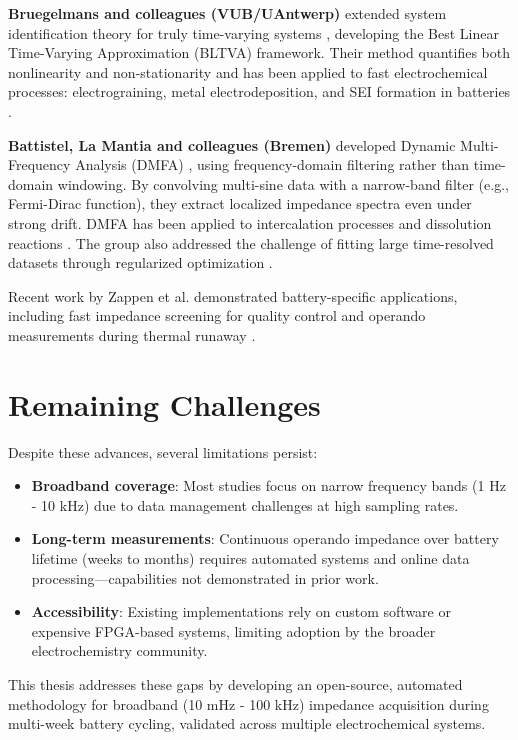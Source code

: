 \textbf{Bruegelmans and colleagues (VUB/UAntwerp)} extended system identification theory for truly time-varying systems \cite{breugelmansOddRandomPhase2012}, developing the Best Linear Time-Varying Approximation (BLTVA) framework. Their method quantifies both nonlinearity and non-stationarity \cite{hallemansDetectionClassificationQuantification2021, hallemansBestLinearTimeVarying2021} and has been applied to fast electrochemical processes: electrograining, metal electrodeposition, and SEI formation in batteries \cite{dabirihavighOperandoORPEISMonitoring2025, hallemansOperandoElectrochemicalImpedance2022}.

\textbf{Battistel, La Mantia and colleagues (Bremen)} developed Dynamic Multi-Frequency Analysis (DMFA) \cite{kosterDynamicImpedanceSpectroscopy2017, battistelPhysicalDefinitionDynamic2019}, using frequency-domain filtering rather than time-domain windowing. By convolving multi-sine data with a narrow-band filter (e.g., Fermi-Dirac function), they extract localized impedance spectra even under strong drift. DMFA has been applied to intercalation processes \cite{scarpioniElectrochemicalImpedanceSpectroscopy2023a, erinmwingbovoDynamicImpedanceSpectroscopy2019, erinmwingbovoDynamicImpedanceSpectroscopy2020} and dissolution reactions \cite{kosterMeasurementAnalysisDynamic2018}. The group also addressed the challenge of fitting large time-resolved datasets through regularized optimization \cite{battistelAnalysisNonstationaryImpedance2016, chukwuDynamicImpedanceSpectroscopy2023}.

Recent work by Zappen et al. \cite{zappenApplicationTimeResolvedMultiSine2018} demonstrated battery-specific applications, including fast impedance screening for quality control and operando measurements during thermal runaway \cite{zappenInOperandoImpedanceSpectroscopy2020a}.

\section{Remaining Challenges}

Despite these advances, several limitations persist:

\begin{itemize}
\item \textbf{Broadband coverage}: Most studies focus on narrow frequency bands (1 Hz - 10 kHz) due to data management challenges at high sampling rates.
\item \textbf{Long-term measurements}: Continuous operando impedance over battery lifetime (weeks to months) requires automated systems and online data processing—capabilities not demonstrated in prior work.
\item \textbf{Accessibility}: Existing implementations rely on custom software or expensive FPGA-based systems, limiting adoption by the broader electrochemistry community.
\end{itemize}

This thesis addresses these gaps by developing an open-source, automated methodology for broadband (10 mHz - 100 kHz) impedance acquisition during multi-week battery cycling, validated across multiple electrochemical systems.
